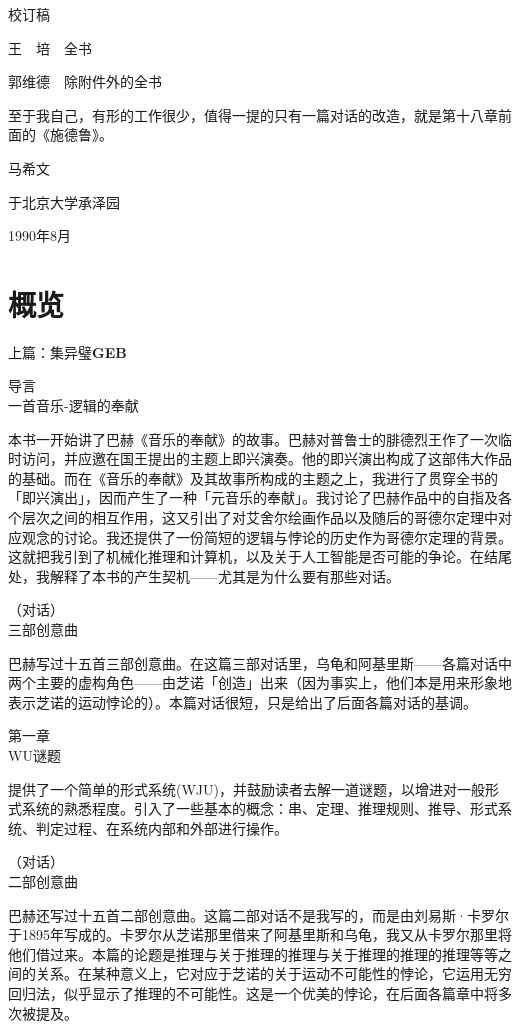\documentclass[
  12pt,
  twoside,
  openright,
  oldfontcommands,
]{memoir}
\newcommand{\kaitibold}[1]{{\kaitifamily\bfseries #1}}
\begin{document}
校订稿

王　培　全书

郭维德　除附件外的全书

至于我自己，有形的工作很少，值得一提的只有一篇对话的改造，就是第十八章前面的《施德鲁》。

马希文

于北京大学承泽园

1990年8月

\label{Overview_split_000.xhtml}{}

\chapter*{概览}

上篇：集异璧\kaitibold{GEB}

导言\\
{一首音乐-逻辑的奉献}

本书一开始讲了巴赫《音乐的奉献》的故事。巴赫对普鲁士的腓德烈王作了一次临时访问，并应邀在国王提出的主题上即兴演奏。他的即兴演出构成了这部伟大作品的基础。而在《音乐的奉献》及其故事所构成的主题之上，我进行了贯穿全书的「即兴演出」，因而产生了一种「元音乐的奉献」。我讨论了巴赫作品中的自指及各个层次之间的相互作用，这又引出了对艾舍尔绘画作品以及随后的哥德尔定理中对应观念的讨论。我还提供了一份简短的逻辑与悖论的历史作为哥德尔定理的背景。这就把我引到了机械化推理和计算机，以及关于人工智能是否可能的争论。在结尾处，我解释了本书的产生契机------尤其是为什么要有那些对话。

（对话）\\
{三部创意曲}

巴赫写过十五首三部创意曲。在这篇三部对话里，乌龟和阿基里斯------各篇对话中两个主要的虚构角色------由芝诺「创造」出来（因为事实上，他们本是用来形象地表示芝诺的运动悖论的）。本篇对话很短，只是给出了后面各篇对话的基调。

第一章\\
{WU谜题}

提供了一个简单的形式系统(WJU)，并鼓励读者去解一道谜题，以增进对一般形式系统的熟悉程度。引入了一些基本的概念：串、定理、推理规则、推导、形式系统、判定过程、在系统内部和外部进行操作。

（对话）\\
{二部创意曲}

巴赫还写过十五首二部创意曲。这篇二部对话不是我写的，而是由刘易斯·卡罗尔于1895年写成的。卡罗尔从芝诺那里借来了阿基里斯和乌龟，我又从卡罗尔那里将他们借过来。本篇的论题是推理与关于推理的推理与关于推理的推理的推理等等之间的关系。在某种意义上，它对应于芝诺的关于运动不可能性的悖论，它运用无穷回归法，似乎显示了推理的不可能性。这是一个优美的悖论，在后面各篇章中将多次被提及。
\end{document}
